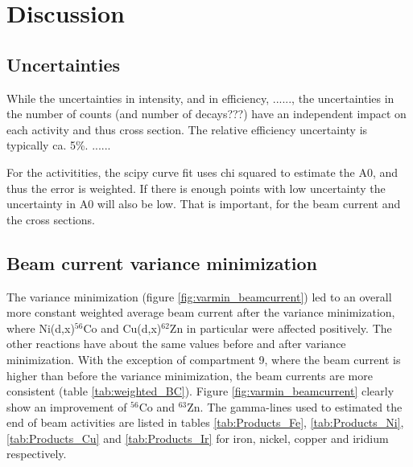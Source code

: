 \chapter{Discussion}



\section{Uncertainties}
While the uncertainties in intensity,  and in efficiency, ......, the uncertainties in the number of counts (and number of decays???) have an independent impact on each activity and thus cross section. 
The relative efficiency uncertainty is typically ca. 5\%. ......

For the activitities, the scipy curve fit uses chi squared to estimate the A0, and thus the error is weighted. If there is enough points with low uncertainty the uncertainty in A0 will also be low. That is important, for the beam current and the cross sections. 

\section{Beam current variance minimization}

The variance minimization (figure \ref{fig:varmin_beamcurrent}) led to an overall more constant weighted average beam current after the variance minimization, where Ni(d,x)$^{56}$Co and Cu(d,x)$^{62}$Zn in particular were affected positively. The other reactions have about the same values before and after variance minimization. With the exception of compartment 9, where the beam current is higher than before the variance minimization, the beam currents are more consistent (table \ref{tab:weighted_BC}). Figure \ref{fig:varmin_beamcurrent} clearly show an improvement of $^{56}$Co and $^{63}$Zn. The gamma-lines used to estimated the end of beam activities are listed in tables \ref{tab:Products_Fe}, \ref{tab:Products_Ni}, \ref{tab:Products_Cu} and \ref{tab:Products_Ir} for iron, nickel, copper and iridium respectively.  \\ 

